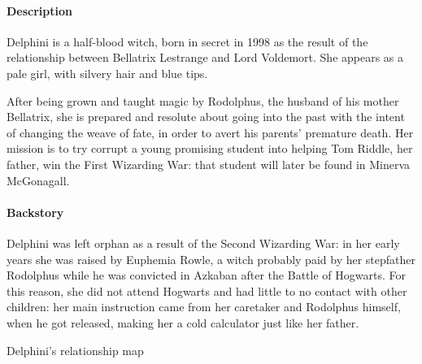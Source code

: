 
\paragraph{Description}
Delphini is a half-blood witch, born in secret in 1998 as the result of the relationship between Bellatrix Lestrange and Lord Voldemort. She appears as a pale girl, with silvery hair and blue tips.

After being grown and taught magic by Rodolphus, the husband of his mother Bellatrix, she is prepared and resolute about going into the past with the intent of changing the weave of fate, in order to avert his parents' premature death. Her mission is to try corrupt a young promising student into helping Tom Riddle, her father, win the First Wizarding War: that student will later be found in Minerva McGonagall. 

\paragraph{Backstory}
Delphini was left orphan as a result of the Second Wizarding War: in her early years she was raised by Euphemia Rowle, a witch probably paid by her stepfather Rodolphus while he was convicted in Azkaban after the Battle of Hogwarts. For this reason, she did not attend Hogwarts and had little to no contact with other children: her main instruction came from her caretaker and Rodolphus himself, when he got released, making her a cold calculator just like her father.
\pagebreak 

\pagebreak

 {Delphini's relationship map}
\pagebreak

\clearpage